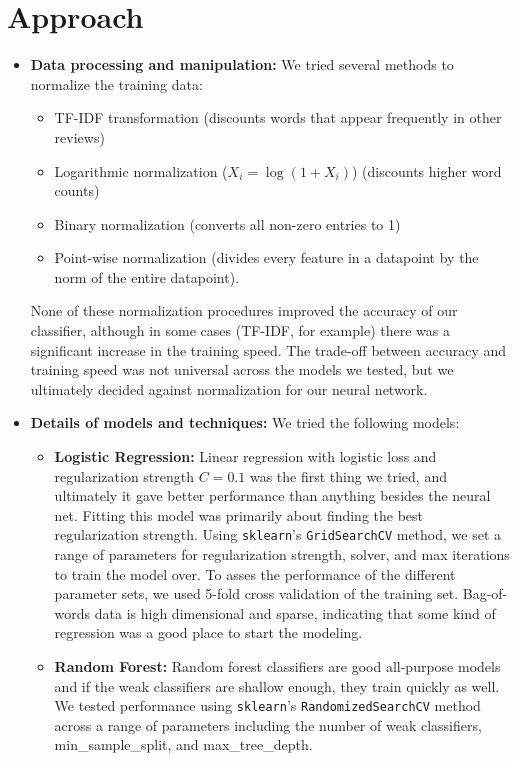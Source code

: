 \section{Approach}
\medskip
\begin{itemize}
  
\item \textbf{Data processing and manipulation:} We tried several methods to normalize the training data:
  \begin{itemize}
  \item TF-IDF transformation (discounts words that appear frequently in other reviews)
  \item Logarithmic normalization ($X_i=\log(1+X_i)$) (discounts higher word counts)
  \item Binary normalization (converts all non-zero entries to 1)
  \item Point-wise normalization (divides every feature in a datapoint by the norm of the entire datapoint).
  \end{itemize}
  None of these normalization procedures improved the accuracy of our classifier, although in some cases (TF-IDF, for example) there was a significant increase in the training speed. The trade-off between accuracy and training speed was not universal across the models we tested, but we ultimately decided against normalization for our neural network.
\item \textbf{Details of models and techniques:} We tried the following models:
  \begin{itemize}
  \item \textbf{Logistic Regression:} Linear regression with logistic loss and regularization strength $C=0.1$ was the first thing we tried, and ultimately it gave better performance than anything besides the neural net. Fitting this model was primarily about finding the best regularization strength. Using \texttt{sklearn}'s \texttt{GridSearchCV} method, we set a range of parameters for regularization strength, solver, and max iterations to train the model over. To asses the performance of the different parameter sets, we used 5-fold cross validation of the training set. Bag-of-words data is high dimensional and sparse, indicating that some kind of regression was a good place to start the modeling. 
  \item \textbf{Random Forest:} Random forest classifiers are good all-purpose models and if the weak classifiers are shallow enough, they train quickly as well. We tested performance using \texttt{sklearn}'s \texttt{RandomizedSearchCV} method across a range of parameters including the number of weak classifiers, min\_sample\_split, and max\_tree\_depth. 

\end{itemize}
\end{itemize}
